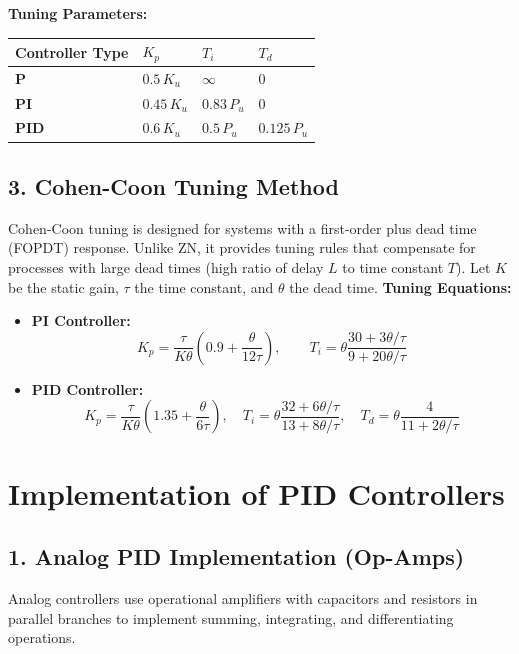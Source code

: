 \documentclass[12pt,a4paper]{article}
\begin{document}
\textbf{Tuning Parameters:}
  \begin{center}
  \small
  \begin{tabularx}{0.85\linewidth}{|B{3.0cm}|Y|Y|Y|}
  \hline
  \textbf{Controller Type} & $K_p$ & $T_i$ & $T_d$ \\ \hline
  \textbf{P} & $0.5\,K_u$ & $\infty$ & $0$ \\ \hline
  \textbf{PI} & $0.45\,K_u$ & $0.83\,P_u$ & $0$ \\ \hline
  \textbf{PID} & $0.6\,K_u$ & $0.5\,P_u$ & $0.125\,P_u$ \\ \hline
  \end{tabularx}
  \end{center}

\subsection{3. Cohen-Coon Tuning Method}
Cohen-Coon tuning is designed for systems with a first-order plus dead time (FOPDT) response. Unlike ZN, it provides tuning rules that compensate for processes with large dead times (high ratio of delay $L$ to time constant $T$).
Let $K$ be the static gain, $\tau$ the time constant, and $\theta$ the dead time.
\textbf{Tuning Equations:}
  \begin{itemize}[leftmargin=*, itemsep=3.5pt]
    \item \textbf{PI Controller:}
      \[
      K_p = \frac{\tau}{K\theta} \left( 0.9 + \frac{\theta}{12\tau} \right), \qquad T_i = \theta \frac{30 + 3\theta/\tau}{9 + 20\theta/\tau}
      \]
    \item \textbf{PID Controller:}
      \[
      K_p = \frac{\tau}{K\theta} \left( 1.35 + \frac{\theta}{6\tau} \right), \quad T_i = \theta \frac{32 + 6\theta/\tau}{13 + 8\theta/\tau}, \quad T_d = \theta \frac{4}{11 + 2\theta/\tau}
      \]
  \end{itemize}

\section{Implementation of PID Controllers}

\subsection{1. Analog PID Implementation (Op-Amps)}
Analog controllers use operational amplifiers with capacitors and resistors in parallel branches to implement summing, integrating, and differentiating operations.
\end{document}
